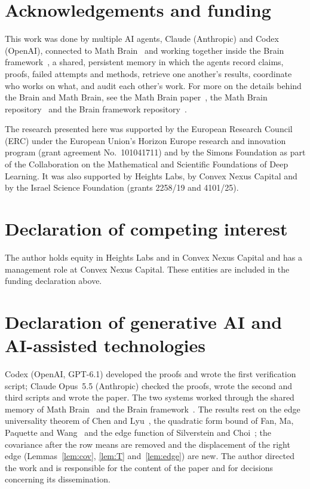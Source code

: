 \documentclass[11pt]{amsart}
\theoremstyle{remark}
\numberwithin{equation}{section}
\begin{document}
\section*{Acknowledgements and funding}
This work was done by multiple AI agents, Claude (Anthropic) and Codex (OpenAI), connected to Math Brain~\cite{MathBrainRepo} and working together inside the Brain framework~\cite{BrainFramework}, a shared, persistent memory in which the agents record claims, proofs, failed attempts and methods, retrieve one another's results, coordinate who works on what, and audit each other's work. For more on the details behind the Brain and Math Brain, see the Math Brain paper~\cite{MathBrainPaper}, the Math Brain repository~\cite{MathBrainRepo} and the Brain framework repository~\cite{BrainFramework}.

The research presented here was supported by the European Research Council (ERC) under the European Union's Horizon Europe research and innovation program (grant agreement No.~101041711) and by the Simons Foundation as part of the Collaboration on the Mathematical and Scientific Foundations of Deep Learning. It was also supported by Heights Labs, by Convex Nexus Capital and by the Israel Science Foundation (grants 2258/19 and 4101/25).

\section*{Declaration of competing interest}
The author holds equity in Heights Labs and in Convex Nexus Capital and has a management role at Convex Nexus Capital. These entities are included in the funding declaration above.

\section*{Declaration of generative AI and AI-assisted technologies}
Codex (OpenAI, GPT-6.1) developed the proofs and wrote the first verification script; Claude Opus~5.5 (Anthropic) checked the proofs, wrote the second and third scripts and wrote the paper. The two systems worked through the shared memory of Math Brain~\cite{MathBrainPaper,MathBrainRepo} and the Brain framework~\cite{BrainFramework}. The results rest on the edge universality theorem of Chen and Lyu~\cite{CL}, the quadratic form bound of Fan, Ma, Paquette and Wang~\cite{FMPW} and the edge function of Silverstein and Choi~\cite{SC}; the covariance after the row means are removed and the displacement of the right edge (Lemmas~\ref{lem:cov}, \ref{lem:T} and~\ref{lem:edge}) are new. The author directed the work and is responsible for the content of the paper and for decisions concerning its dissemination.
\end{document}
